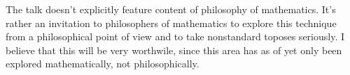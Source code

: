 \documentclass[a4paper,english,11pt]{scrartcl}
\begin{document}
The talk doesn't explicitly feature content of philosophy of mathematics. It's
rather an invitation to philosophers of mathematics to explore this technique
from a philosophical point of view and to take nonstandard toposes seriously. I
believe that this will be very worthwile, since this area has as of yet only
been explored mathematically, not philosophically.
\end{document}
